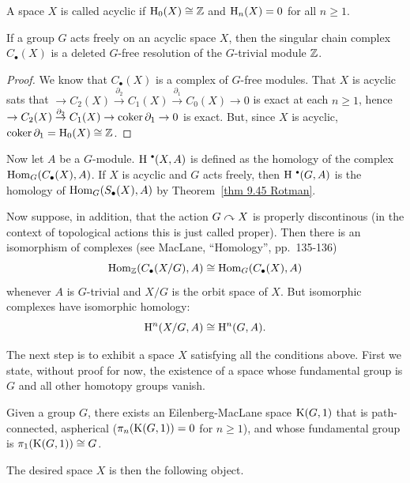 \begin{defn}
    A space $X$ is called acyclic if $\mathrm{H}_0(X)\cong \mathbb{Z}$ and $\mathrm{H}_n(X)=0$ for all $n\geq 1$.
\end{defn}

\begin{thm}\label{thm 9.45 Rotman}
    If a group $G$ acts freely on an acyclic space $X$, then the singular chain complex $C_\bullet(X)$ is a deleted $G$-free resolution of the $G$-trivial module $\mathbb{Z}$.
\end{thm}
\begin{proof}
    We know that $C_\bullet(X)$ is a complex of $G$-free modules. That $X$ is acyclic sats that $\to C_2(X)\overset{\partial_2}{\to}C_1(X)\overset{\partial_1}{\to}C_0(X)\to 0$ is exact at each $n\geq 1$, hence $\to C_2(X)\overset{\partial_2}{\to}C_1(X)\to \operatorname{coker} \partial_1\to 0$ is exact. But, since $X$ is acyclic, $\operatorname{coker} \partial_1=\mathrm{H}_0(X)\cong \mathbb{Z}$.
\end{proof}

Now let $A$ be a $G$-module. $\rmH^{\smbullet }(X,A)$ is defined as the homology of the complex $\operatorname{Hom}_G(C_\bullet(X),A)$. If $X$ is acyclic and $G$ acts freely, then $\rmH^{\smbullet }(G,A)$ is the homology of $\operatorname{Hom}_G(S_\bullet(X),A)$ by Theorem~\ref{thm 9.45 Rotman}. 

Now suppose, in addition, that the action $G\curvearrowright X$ is properly discontinous (in the context of topological actions this is just called proper). Then there is an isomorphism of complexes (see MacLane, ``Homology'', pp.~135-136)
\[\operatorname{Hom}_{\mathbb{Z}}(C_\bullet(X\slash G),A)\cong \operatorname{Hom}_G(C_\bullet(X),A)\]
whenever $A$ is $G$-trivial and $X\slash G$ is the orbit space of $X$. But isomorphic complexes have isomorphic homology:
\[\mathrm{H}^n(X\slash G,A)\cong \mathrm{H}^n(G,A).\label{eq 2 rotman}\]

The next step is to exhibit a space $X$ satisfying all the conditions above. First we state, without proof for now, the existence of a space whose fundamental group is $G$ and all other homotopy groups vanish.

\begin{defn}
    Given a group $G$, there exists an Eilenberg-MacLane space $\mathrm{K}(G,1)$ that is path-connected, aspherical ($\pi_n(\mathrm{K}(G,1))=0$ for $n\geq 1$), and whose fundamental group is $\pi_1(\mathrm{K}(G,1))\cong G$.
\end{defn}

The desired space $X$ is then the following object.

